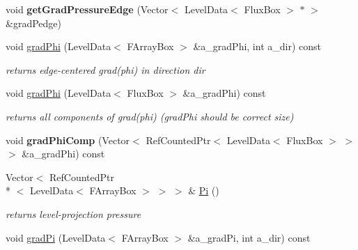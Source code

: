 \begin{DoxyCompactItemize}
\item 
\hypertarget{class_c_c_projector_comp_abb8bb80435b0c35ef26f2d5bbccdda6a}{void {\bfseries get\-Grad\-Pressure\-Edge} (Vector$<$ Level\-Data$<$ Flux\-Box $>$ $\ast$ $>$ \&grad\-Pedge)}\label{class_c_c_projector_comp_abb8bb80435b0c35ef26f2d5bbccdda6a}

\item 
\hypertarget{class_c_c_projector_comp_a9165b3353fa299118bea7641861c9d84}{void \hyperlink{class_c_c_projector_comp_a9165b3353fa299118bea7641861c9d84}{grad\-Phi} (Level\-Data$<$ F\-Array\-Box $>$ \&a\-\_\-grad\-Phi, int a\-\_\-dir) const }\label{class_c_c_projector_comp_a9165b3353fa299118bea7641861c9d84}

\begin{DoxyCompactList}\small\item\em returns edge-\/centered grad(phi) in direction dir \end{DoxyCompactList}\item 
\hypertarget{class_c_c_projector_comp_ae7f0354513a01ca1cd306a2a029e981e}{void \hyperlink{class_c_c_projector_comp_ae7f0354513a01ca1cd306a2a029e981e}{grad\-Phi} (Level\-Data$<$ Flux\-Box $>$ \&a\-\_\-grad\-Phi) const }\label{class_c_c_projector_comp_ae7f0354513a01ca1cd306a2a029e981e}

\begin{DoxyCompactList}\small\item\em returns all components of grad(phi) (grad\-Phi should be correct size) \end{DoxyCompactList}\item 
\hypertarget{class_c_c_projector_comp_afd78974bbcf29bbb085ec43c18e8bbcf}{void {\bfseries grad\-Phi\-Comp} (Vector$<$ Ref\-Counted\-Ptr$<$ Level\-Data$<$ Flux\-Box $>$ $>$ $>$ \&a\-\_\-grad\-Phi) const }\label{class_c_c_projector_comp_afd78974bbcf29bbb085ec43c18e8bbcf}

\item 
\hypertarget{class_c_c_projector_comp_a788fca9264ed4a262cf7695c4e5fc497}{Vector$<$ Ref\-Counted\-Ptr\\*
$<$ Level\-Data$<$ F\-Array\-Box $>$ $>$ $>$ \& \hyperlink{class_c_c_projector_comp_a788fca9264ed4a262cf7695c4e5fc497}{Pi} ()}\label{class_c_c_projector_comp_a788fca9264ed4a262cf7695c4e5fc497}

\begin{DoxyCompactList}\small\item\em returns level-\/projection pressure \end{DoxyCompactList}\item 
\hypertarget{class_c_c_projector_comp_a6d33a730fa1168dab808dc87bb06c723}{void \hyperlink{class_c_c_projector_comp_a6d33a730fa1168dab808dc87bb06c723}{grad\-Pi} (Level\-Data$<$ F\-Array\-Box $>$ \&a\-\_\-grad\-Pi, int a\-\_\-dir) const }\label{class_c_c_projector_comp_a6d33a730fa1168dab808dc87bb06c723}


\end{DoxyCompactItemize}
